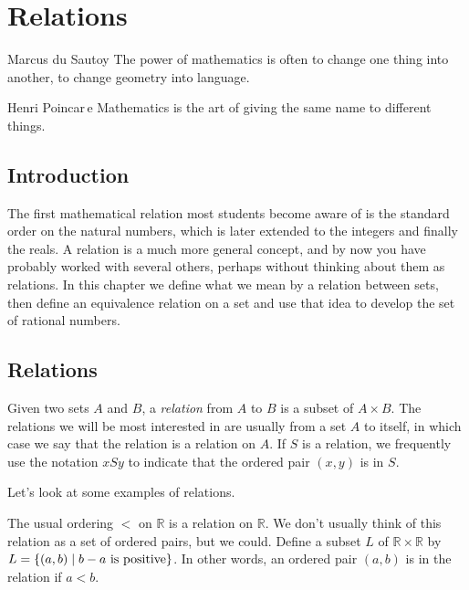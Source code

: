 \chapter{Relations}

\begin{chapqt}{Marcus du Sautoy}
The power of mathematics is often to change one thing into another, to change geometry into language.
\end{chapqt}

\begin{chapqt}{Henri Poincar\,e}
Mathematics is the art of giving the same name to different things.
\end{chapqt}

\section*{Introduction}
The first mathematical relation most students become aware of is the standard order on the natural numbers, which is later extended to the integers and finally the reals. A relation is a much more general concept, and by now you have probably worked with several others, perhaps without thinking about them as relations. In this chapter we define what we mean by a relation between sets, then define an equivalence relation on a set and use that idea to develop the set of rational numbers.

\section{Relations}

\begin{definition}
Given two sets $A$ and $B$, a \emph{relation} from $A$ to $B$ is a subset of $A\times B$.  The relations we will be most interested in are usually from a set $A$ to itself, in which case we say that the relation is a relation on $A$. If $S$ is a relation, we frequently use the notation $xSy$ to indicate that the ordered pair $(x,y)$ is in $S$.
\end{definition}

Let's look at some examples of relations.

\begin{example}
The usual ordering $<$ on $\mathbb R$ is a relation on $\mathbb R$.  We don't usually think of this relation as a set of ordered pairs, but we could.  Define a subset $L$ of $\mathbb R\times \mathbb R$ by $L=\{(a,b)\mid b-a \hbox{ is positive}\}$.  In other words, an ordered pair $(a,b)$ is in the relation if $a<b$. \end{example}


